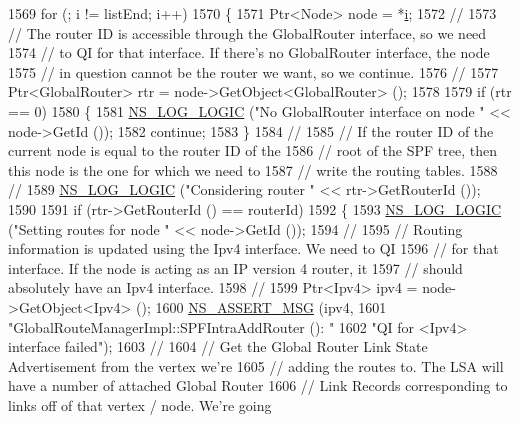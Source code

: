\begin{DoxyCode}
1569   \textcolor{keywordflow}{for} (; i != listEnd; i++)
1570     \{
1571       Ptr<Node> node = *\hyperlink{bernuolliDistribution_8m_a6f6ccfcf58b31cb6412107d9d5281426}{i};
1572 \textcolor{comment}{//}
1573 \textcolor{comment}{// The router ID is accessible through the GlobalRouter interface, so we need}
1574 \textcolor{comment}{// to QI for that interface.  If there's no GlobalRouter interface, the node}
1575 \textcolor{comment}{// in question cannot be the router we want, so we continue.}
1576 \textcolor{comment}{// }
1577       Ptr<GlobalRouter> rtr = node->GetObject<GlobalRouter> ();
1578 
1579       \textcolor{keywordflow}{if} (rtr == 0)
1580         \{
1581           \hyperlink{group__logging_ga88acd260151caf2db9c0fc84997f45ce}{NS\_LOG\_LOGIC} (\textcolor{stringliteral}{"No GlobalRouter interface on node "} << node->GetId ());
1582           \textcolor{keywordflow}{continue};
1583         \}
1584 \textcolor{comment}{//}
1585 \textcolor{comment}{// If the router ID of the current node is equal to the router ID of the }
1586 \textcolor{comment}{// root of the SPF tree, then this node is the one for which we need to }
1587 \textcolor{comment}{// write the routing tables.}
1588 \textcolor{comment}{//}
1589       \hyperlink{group__logging_ga88acd260151caf2db9c0fc84997f45ce}{NS\_LOG\_LOGIC} (\textcolor{stringliteral}{"Considering router "} << rtr->GetRouterId ());
1590 
1591       \textcolor{keywordflow}{if} (rtr->GetRouterId () == routerId)
1592         \{
1593           \hyperlink{group__logging_ga88acd260151caf2db9c0fc84997f45ce}{NS\_LOG\_LOGIC} (\textcolor{stringliteral}{"Setting routes for node "} << node->GetId ());
1594 \textcolor{comment}{//}
1595 \textcolor{comment}{// Routing information is updated using the Ipv4 interface.  We need to QI}
1596 \textcolor{comment}{// for that interface.  If the node is acting as an IP version 4 router, it}
1597 \textcolor{comment}{// should absolutely have an Ipv4 interface.}
1598 \textcolor{comment}{//}
1599           Ptr<Ipv4> ipv4 = node->GetObject<Ipv4> ();
1600           \hyperlink{assert_8h_aff5ece9066c74e681e74999856f08539}{NS\_ASSERT\_MSG} (ipv4, 
1601                          \textcolor{stringliteral}{"GlobalRouteManagerImpl::SPFIntraAddRouter (): "}
1602                          \textcolor{stringliteral}{"QI for <Ipv4> interface failed"});
1603 \textcolor{comment}{//}
1604 \textcolor{comment}{// Get the Global Router Link State Advertisement from the vertex we're}
1605 \textcolor{comment}{// adding the routes to.  The LSA will have a number of attached Global Router}
1606 \textcolor{comment}{// Link Records corresponding to links off of that vertex / node.  We're going}

\end{DoxyCode}
